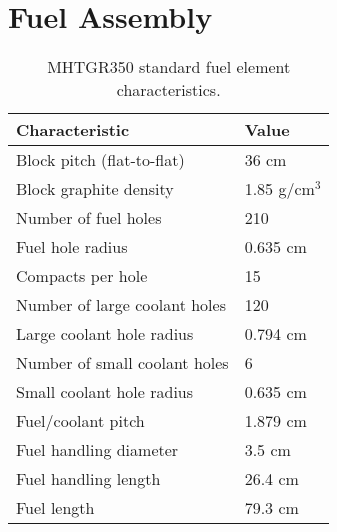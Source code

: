 \documentclass[11pt,letterpaper]{article}
\begin{document}
\section{Fuel Assembly}

	\begin{table}[H]
		\centering
	    \caption{MHTGR350 standard fuel element characteristics.}
	    \label{tab:scharacteristics}
		\begin{tabular}{l|l}
		\hline
		Characteristic                   & Value         \\ \hline
		Block pitch (flat-to-flat)       & 36 cm         \\
		Block graphite density           & 1.85 g/cm$^3$ \\
		Number of fuel holes             & 210           \\
		Fuel hole radius                 & 0.635 cm      \\
		Compacts per hole                & 15            \\
		Number of large coolant holes    & 120           \\
		Large coolant hole radius        & 0.794 cm      \\
		Number of small coolant holes    & 6             \\
		Small coolant hole radius        & 0.635 cm      \\
		Fuel/coolant pitch               & 1.879 cm      \\
		Fuel handling diameter           & 3.5 cm        \\ 
		Fuel handling length             & 26.4 cm       \\ 
		Fuel length                      & 79.3 cm       \\ \hline
		\end{tabular}
	\end{table}
\end{document}
